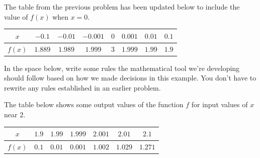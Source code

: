 \documentclass[10pt]{article}
\begin{document}
\vfill

 The table from the previous problem has been updated below to include the value of $f(x)$ when $x=0$.

\begin{center}
\begin{tabular}{| c || c c c c c c c |}
\hline
 $x$  & $-0.1$ & $-0.01$ & $-0.001$ & $0$ & $0.001$ & $0.01$ & $0.1$\\ 
 \hline
 $f(x)$ & $1.889$ & $1.989$  & $1.999$ & $3$ & $1.999$   & $1.99$  & $1.9$\\
 \hline
\end{tabular}
\end{center}


In the space below, write some rules the mathematical tool we're developing should follow based on how we made decisions in this example. You don't have to rewrite any rules established in an earlier problem.

\vfill

\newpage
{}The table below shows some output values of the function $f$ for input values of $x$ near $2$. 
%
\begin{center}
\begin{tabular}{| c || c c c c c c |}
\hline
 $x$  & $1.9$ & $1.99$ & $1.999$ & $2.001$ & $2.01$ & $2.1$\\ 
 \hline
 $f(x)$ & $0.1$ & $0.01$  & $0.001$ & $1.002$   & $1.029$  & $1.271$\\
 \hline
\end{tabular}
\end{center}

\end{document}
